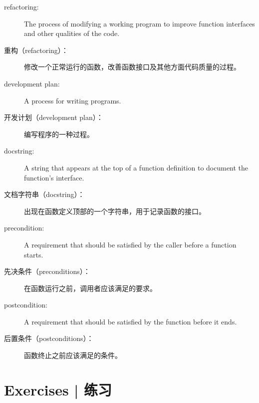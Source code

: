 \begin{description}
\item[refactoring:] The process of modifying a working program to
  improve function interfaces and other qualities of the code.

\item[重构（refactoring）：]
    修改一个正常运行的函数，改善函数接口及其他方面代码质量的过程。

\item[development plan:] A process for writing programs.

\item[开发计划（development plan）：]
    编写程序的一种过程。

\item[docstring:] A string that appears at the top of a function
  definition to document the function's interface.

\item[文档字符串（docstring）：]
    出现在函数定义顶部的一个字符串，用于记录函数的接口。

\item[precondition:] A requirement that should be satisfied by
the caller before a function starts.

\item[先决条件（preconditions）：]
    在函数运行之前，调用者应该满足的要求。

\item[postcondition:] A requirement that should be satisfied by
the function before it ends.

\item[后置条件（postconditions）：]
    函数终止之前应该满足的条件。

\end{description}


\section{Exercises  |  练习}

